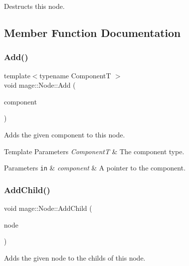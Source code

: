 Destructs this node. 

\subsection{Member Function Documentation}
\hypertarget{classmage_1_1_node_a58452a6195ebea7a1a7a26f9a4dd8102}{}\label{classmage_1_1_node_a58452a6195ebea7a1a7a26f9a4dd8102} 
\subsubsection{\texorpdfstring{Add()}{Add()}}
{\footnotesize\ttfamily template$<$typename ComponentT $>$ \\
void mage\+::\+Node\+::\+Add (\begin{DoxyParamCaption}\item[{\hyperlink{classmage_1_1_proxy_ptr}{Proxy\+Ptr}$<$ ComponentT $>$}]{component }\end{DoxyParamCaption})}

Adds the given component to this node.


\begin{DoxyTemplParams}{Template Parameters}
{\em ComponentT} & The component type. \\
\hline
\end{DoxyTemplParams}

\begin{DoxyParams}[1]{Parameters}
\mbox{\tt in}  & {\em component} & A pointer to the component. \\
\hline
\end{DoxyParams}
\hypertarget{classmage_1_1_node_ad2324a1a111548e4b80b8e4cbaba5221}{}\label{classmage_1_1_node_ad2324a1a111548e4b80b8e4cbaba5221} 
\subsubsection{\texorpdfstring{Add\+Child()}{AddChild()}}
{\footnotesize\ttfamily void mage\+::\+Node\+::\+Add\+Child (\begin{DoxyParamCaption}\item[{\hyperlink{classmage_1_1_node_ac575dc006e0ae1134277ade977dc06b6}{Node\+Ptr}}]{node }\end{DoxyParamCaption})}

Adds the given node to the childs of this node.


